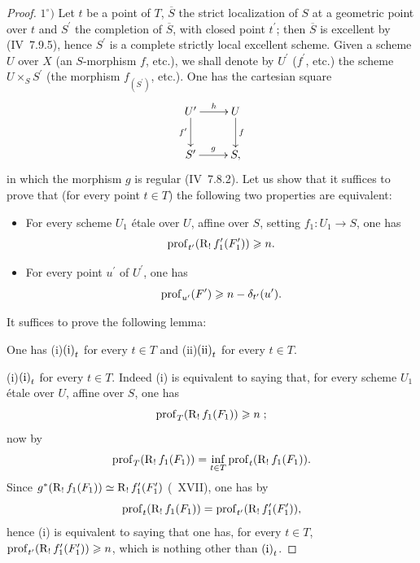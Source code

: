 \begin{proof}
$1^\circ)$ Let $t$ be a point of $T$, $\overline{S}$ the strict localization of $S$ at a geometric point over $t$ and $S^{\prime}$ the completion of $\overline{S}$, with closed point $t^{\prime}$; then $\overline{S}$ is excellent by (\EGA IV~7.9.5), hence $S^{\prime}$ is a complete strictly local excellent scheme. Given a scheme $U$ over $X$ (\resp an $S$-morphism $f$, \resp etc.), we shall denote by $U^{\prime}$ (\resp $f^{\prime}$, \resp etc.) the scheme $U\times_{S}S^{\prime}$ (\resp the morphism $f_{(S^{\prime})}$, \resp etc.). One has the cartesian square
$$
\xymatrix{ U^{\prime}\ar[r]^-{h}\ar[d]_-{f^{\prime}} & U\ar[d]^-{f}\\
S^{\prime}\ar[r]^-{g} & S, }
$$
in which the morphism $g$ is regular (\EGA IV~7.8.2). Let us show that it suffices to prove that (for every point $t\in T$) the following two properties are equivalent:
\begin{itemize}
\item[$\textup{(i)}_{t}$] For every scheme $U_{1}$ \'etale over $U$, affine over $S$, setting $f_{1}\colon U_{1}\to S$, one has
$$
\operatorname{prof}_{t^{\prime}}(\operatorname{R}_{!}f_{1}^{\prime}(F_{1}^{\prime}))\geqslant n.
$$

\item[$\textup{(ii)}_{t}$] For every point $u^{\prime}$ of $U^{\prime}$, one has
$$
\operatorname{prof}_{u^{\prime}}(F^{\prime})\geqslant n-\delta_{t^{\prime}}(u^{\prime}).
$$
\end{itemize}
It suffices to prove the following lemma:

\begin{sublemma} \label{XIV.4.2.1}
One has \textup{(i)}\SSI$\textup{(i)}_{t}$ for every $t\in T$ and \textup{(ii)}\SSI$\textup{(ii)}_{t}$ for every $t\in T$.
\end{sublemma}

\textup{(i)}\SSI$\textup{(i)}_{t}$ for every $t\in T$. Indeed \textup{(i)} is equivalent to saying that, for every scheme $U_{1}$ \'etale over $U$, affine over $S$, one has
$$
\operatorname{prof}_{T}(\operatorname{R}_{!}f_{1}(F_{1}))\geqslant n\;;$$
now by 
$$
\operatorname{prof}_{T}(\operatorname{R}_{!}f_{1}(F_{1}))=\inf_{t\in T}\operatorname{prof}_{t}(\operatorname{R}_{!}f_{1}(F_{1})).
$$
Since $g^{\ast}(\operatorname{R}_{!}f_{1}(F_{1}))\simeq\operatorname{R}_{!}f_{1}^{\prime}(F_{1}^{\prime})$ (~XVII), one has by 
$$
\operatorname{prof}_{t}(\operatorname{R}_{!}f_{1}(F_{1}))=\operatorname{prof}_{t^{\prime}}(\operatorname{R}_{!}f_{1}^{\prime}(F_{1}^{\prime})),
$$
hence \textup{(i)} is equivalent to saying that one has, for every $t\in T$, $\operatorname{prof}_{t^{\prime}}(\operatorname{R}_{!}f_{1}^{\prime}(F_{1}^{\prime}))\geqslant n$, which is nothing other than $\textup{(i)}_{t}$.


\end{proof}
